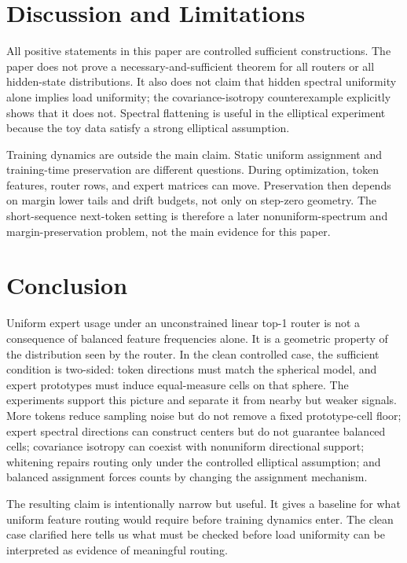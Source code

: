 \section{Discussion and Limitations}

All positive statements in this paper are controlled sufficient constructions.
The paper does not prove a necessary-and-sufficient theorem for all routers or
all hidden-state distributions. It also does not claim that hidden spectral
uniformity alone implies load uniformity; the covariance-isotropy counterexample
explicitly shows that it does not. Spectral flattening is useful in the
elliptical experiment because the toy data satisfy a strong elliptical
assumption.

Training dynamics are outside the main claim. Static uniform assignment and
training-time preservation are different questions. During optimization, token
features, router rows, and expert matrices can move. Preservation then depends
on margin lower tails and drift budgets, not only on step-zero geometry. The
short-sequence next-token setting is therefore a later nonuniform-spectrum and
margin-preservation problem, not the main evidence for this paper.

\section{Conclusion}

Uniform expert usage under an unconstrained linear top-1 router is not a
consequence of balanced feature frequencies alone. It is a geometric property
of the distribution seen by the router. In the clean controlled case, the
sufficient condition is two-sided: token directions must match the spherical
model, and expert prototypes must induce equal-measure cells on that sphere.
The experiments support this picture and separate it from nearby but weaker
signals. More tokens reduce sampling noise but do not remove a fixed
prototype-cell floor; expert spectral directions can construct centers but do
not guarantee balanced cells; covariance isotropy can coexist with nonuniform
directional support; whitening repairs routing only under the controlled
elliptical assumption; and balanced assignment forces counts by changing the
assignment mechanism.

The resulting claim is intentionally narrow but useful. It gives a baseline for
what uniform feature routing would require before training dynamics enter. The
clean case clarified here tells us what must be checked before load uniformity
can be interpreted as evidence of meaningful routing.
